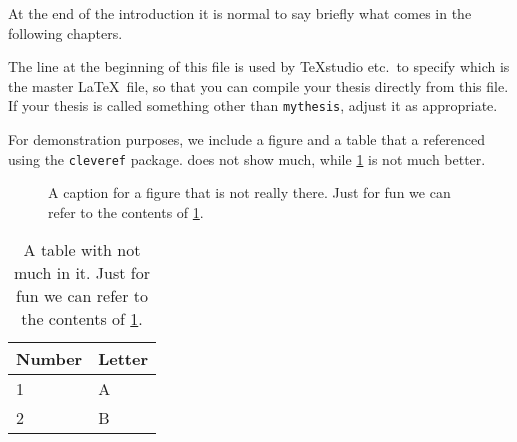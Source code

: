 At the end of the introduction it is normal to say briefly what comes
in the following chapters.

The line at the beginning of this file is used by TeXstudio etc.\ to
specify which is the master \LaTeX\ file, so that you can compile your thesis
directly from this file.
If your thesis is called something other than \texttt{mythesis}, adjust it as appropriate.

For demonstration purposes,
we include a figure and a table that a referenced using the \texttt{cleveref} package.
 does not show much,
while \cref{tab:little} is not much better.

\begin{figure}[htbp]
  \centering
  \fbox{\textcolor{red}{This is not really a figure!}}
  \caption{A caption for a figure that is not really there.
    Just for fun we can refer to the contents of \cref{tab:little}.}
  \label{fig:nothing}
\end{figure}

\begin{table}[htbp]
  \caption{A table with not much in it.
    Just for fun we can refer to the contents of \cref{fig:nothing}.}
  \label{tab:little}
  \centering
  \begin{tabular}{ll}
    \toprule
    Number & Letter \\
    \midrule
    1 & A \\
    2 & B \\
    \bottomrule  
  \end{tabular}
\end{table}

